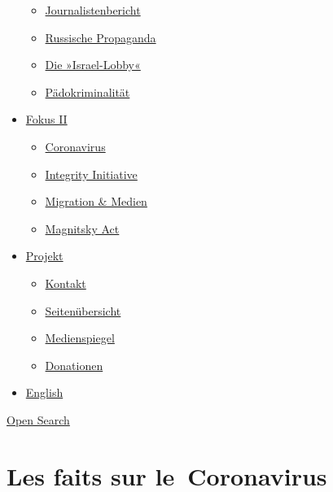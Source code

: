 \begin{itemize}
  \begin{itemize}
  \tightlist
  \item
    \href{https://swprs.org/bericht-eines-journalisten/}{Journalistenbericht}
  \item
    \href{https://swprs.org/russische-propaganda/}{Russische Propaganda}
  \item
    \href{https://swprs.org/die-israel-lobby-fakten-und-mythen/}{Die
    »Israel-Lobby«}
  \item
    \href{https://swprs.org/geopolitik-und-paedokriminalitaet/}{Pädokriminalität}
  \end{itemize}
\item
  \href{https://swprs.org/migration-und-medien/}{Fokus II}

  \begin{itemize}
  \tightlist
  \item
    \href{https://swprs.org/covid-19-hinweis-ii/}{Coronavirus}
  \item
    \href{https://swprs.org/die-integrity-initiative/}{Integrity
    Initiative}
  \item
    \href{https://swprs.org/migration-und-medien/}{Migration \& Medien}
  \item
    \href{https://swprs.org/der-fall-magnitsky/}{Magnitsky Act}
  \end{itemize}
\item
  \href{https://swprs.org/kontakt/}{Projekt}

  \begin{itemize}
  \tightlist
  \item
    \href{https://swprs.org/kontakt/}{Kontakt}
  \item
    \href{https://swprs.org/uebersicht/}{Seitenübersicht}
  \item
    \href{https://swprs.org/medienspiegel/}{Medienspiegel}
  \item
    \href{https://swprs.org/donationen/}{Donationen}
  \end{itemize}
\item
  \href{https://swprs.org/contact/}{English}
\end{itemize}

\protect\hyperlink{}{Open Search}

\hypertarget{les-faits-sur-le-coronavirus}{%
\section{Les faits sur
le~Coronavirus}\label{les-faits-sur-le-coronavirus}}

